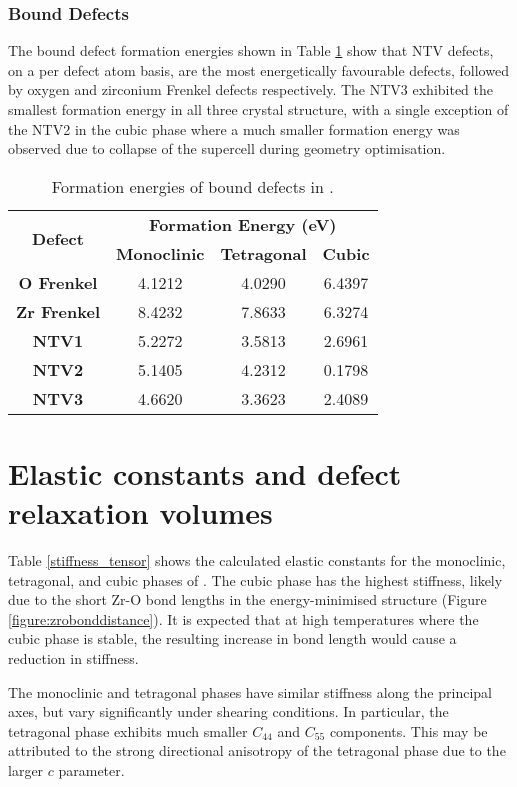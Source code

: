\subsubsection*{Bound Defects}
The bound defect formation energies shown in Table \ref{table:bound_defects} show that NTV defects, on a per defect atom basis, are the most energetically favourable defects, followed by oxygen and zirconium Frenkel defects respectively. The NTV3 exhibited the smallest formation energy in all three crystal structure, with a single exception of the NTV2 in the cubic phase where a much smaller formation energy was observed due to collapse of the supercell during geometry optimisation.

\begin{table}[ht] %
\onehalfspacing
\centering
\caption{Formation energies of bound defects in \zirconia.}
\label{table:bound_defects}
\begin{tabular}{cccc}
\hline
\multirow{2}{*}{\textbf{Defect}} & \multicolumn{3}{c}{\textbf{Formation Energy (eV)}} \\ \cline{2-4} 
 & \textbf{Monoclinic} & \textbf{Tetragonal} & \textbf{Cubic} \\ \hline
\textbf{O Frenkel} & 4.1212 & 4.0290 & 6.4397 \\
\textbf{Zr Frenkel} & 8.4232 & 7.8633 & 6.3274 \\
\textbf{NTV1} & 5.2272 & 3.5813 & 2.6961 \\
\textbf{NTV2} & 5.1405 & 4.2312 & 0.1798 \\
\textbf{NTV3} & 4.6620 & 3.3623 & 2.4089 \\ \hline
\end{tabular}
\end{table}

\section{Elastic constants and defect relaxation volumes}

Table \ref{stiffness_tensor} shows the calculated elastic constants for the monoclinic, tetragonal, and cubic phases of \zirconia . The cubic phase has the highest stiffness, likely due to the short Zr-O bond lengths in the energy-minimised structure (Figure \ref{figure:zrobonddistance}). It is expected that at high temperatures where the cubic phase is stable, the resulting increase in bond length would cause a reduction in stiffness. 

The monoclinic and tetragonal phases have similar stiffness along the principal axes, but vary significantly under shearing conditions. In particular, the tetragonal phase exhibits much smaller $C_{44}$ and $C_{55}$ components. This may be attributed to the strong directional anisotropy of the tetragonal phase due to the larger $c$ parameter. 



